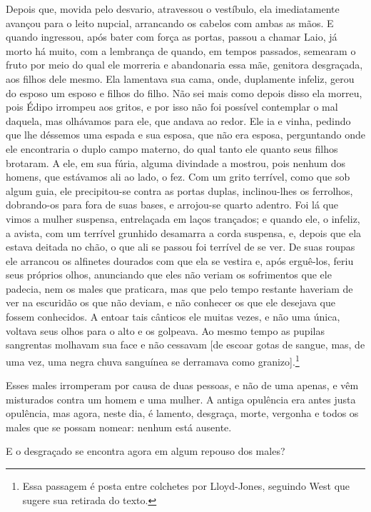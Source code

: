 Depois que, movida pelo desvario, atravessou o vestíbulo, ela
imediatamente avançou para o leito nupcial, arrancando os cabelos com
ambas as mãos. E quando ingressou, após bater com força as portas,
passou a chamar Laio, já morto há muito, com a lembrança de quando, em
tempos passados, semearam o fruto por meio do qual ele morreria e
abandonaria essa mãe, genitora desgraçada, aos filhos dele mesmo.
Ela lamentava sua cama, onde, duplamente infeliz, gerou do esposo um
esposo e filhos do filho. Não sei mais como depois disso ela morreu,
pois Édipo irrompeu aos gritos, e por isso não foi possível contemplar o
mal daquela, mas olhávamos para ele, que andava ao redor. Ele ia e
vinha, pedindo que lhe déssemos uma espada e sua esposa, que não era
esposa, perguntando onde ele encontraria o duplo campo materno, do qual
tanto ele quanto seus filhos brotaram. A ele, em sua fúria, alguma
divindade a mostrou, pois nenhum dos homens, que estávamos ali ao lado,
o fez. Com um grito terrível, como que sob algum guia, ele
precipitou-se contra as portas duplas, inclinou-lhes os ferrolhos,
dobrando-os para fora de suas bases, e arrojou-se quarto adentro. Foi lá
que vimos a mulher suspensa, entrelaçada em laços trançados; e quando
ele, o infeliz, a avista, com um terrível grunhido desamarra a corda
suspensa, e, depois que ela estava deitada no chão, o que ali se passou
foi terrível de se ver. De suas roupas ele arrancou os alfinetes
dourados com que ela se vestira e, após erguê-los, feriu seus próprios
olhos, anunciando que eles não veriam os sofrimentos que ele
padecia, nem os males que praticara, mas que pelo tempo restante
haveriam de ver na escuridão os que não deviam, e não conhecer os que
ele desejava que fossem conhecidos. A entoar tais cânticos ele muitas
vezes, e não uma única, voltava seus olhos para o alto e os golpeava. Ao
mesmo tempo as pupilas sangrentas molhavam sua face e não cessavam {[}de
escoar gotas de sangue, mas, de uma vez, uma negra chuva sanguínea se
derramava como granizo{]}.\footnote{Essa passagem é posta entre colchetes
  por Lloyd-Jones, seguindo West que sugere sua retirada do texto.}

 Esses males irromperam por causa de duas pessoas, e não de uma
apenas, e vêm misturados contra um homem e uma mulher. A antiga
opulência era antes justa opulência, mas agora, neste dia, é lamento,
desgraça, morte, vergonha e todos os males que se possam nomear: nenhum
está ausente.

   E o desgraçado se encontra agora em algum repouso dos males?

